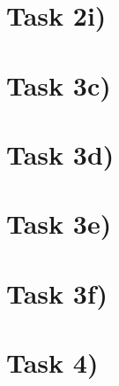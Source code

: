 \documentclass[a4paper,oneside,bibliography=totoc]{scrartcl}
\begin{document}
\section*{Task 2i)}
\begin{answer}[6cm]
\end{answer}


\section*{Task 3c)}
\begin{answer}[4cm]
\end{answer}

\section*{Task 3d)}
\begin{answer}[19cm]
\end{answer}

\section*{Task 3e)}
\begin{answer}[19cm]
\end{answer}

\section*{Task 3f)}
\begin{answer}[19cm]
\end{answer}


\section*{Task 4)}
\begin{answer}[19cm]
\end{answer}


\clearpage

\end{document}
